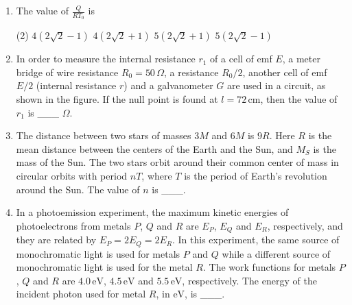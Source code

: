 \documentclass{article}
\begin{document}
\begin{enumerate}
    \item The value of \(\frac{Q}{RT_0}\) is 
    \begin{tasks}(2)
        \task $4(2\sqrt{2}-1)$
        \task $4(2\sqrt{2}+1)$
        \task $5(2\sqrt{2}+1)$
        \task $5(2\sqrt{2}-1)$
    \end{tasks}



    \item In order to measure the internal resistance $ r_1 $ of a cell of emf $ E $, a meter bridge of wire resistance $ R_0 = 50 \, \Omega $, a resistance $ R_0/2 $, another cell of emf $ E/2 $ (internal resistance $ r $) and a galvanometer $ G $ are used in a circuit, as shown in the figure. If the null point is found at $ l = 72 \, \text{cm} $, then the value of $ r_1 $ is \_\_\_ $ \Omega $.
    
    \begin{center}
    \end{center}
    
    \item The distance between two stars of masses $ 3M $ and $ 6M $ is $ 9R $. Here $ R $ is the mean distance between the centers of the Earth and the Sun, and $ M_S $ is the mass of the Sun. The two stars orbit around their common center of mass in circular orbits with period $ nT $, where $ T $ is the period of Earth's revolution around the Sun. The value of $ n $ is \_\_\_.
    
    \item In a photoemission experiment, the maximum kinetic energies of photoelectrons from metals $P$, $Q$ and $R$ are $E_P$, $E_Q$ and $E_R$, respectively, and they are related by $E_P = 2E_Q = 2E_R$. In this experiment, the same source of monochromatic light is used for metals $P$ and $Q$ while a different source of monochromatic light is used for the metal $R$. The work functions for metals $P$, $Q$ and $R$ are $4.0 \, \text{eV}$, $4.5 \, \text{eV}$ and $5.5 \, \text{eV}$, respectively. The energy of the incident photon used for metal $R$, in $\text{eV}$, is \_\_\_.
    
\end{enumerate}
\end{document}
